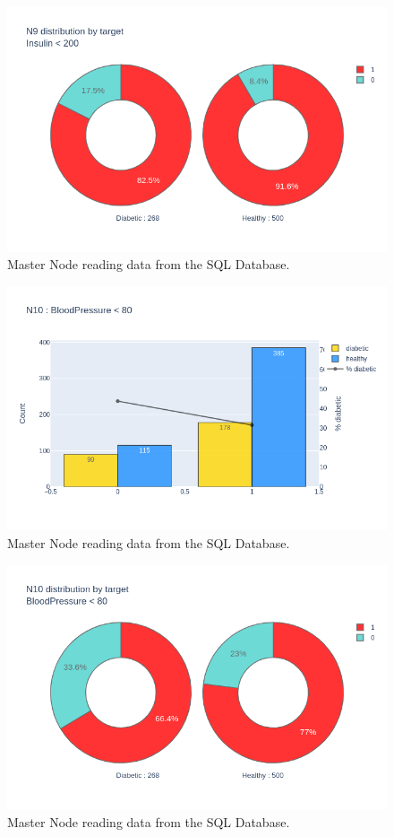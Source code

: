 \documentclass[12pt]{article}
\begin{document}
\begin{figure}[ht]
\centering
\includegraphics[width=1\textwidth]{newplot(33).png}
\caption{Master Node reading data from the SQL Database.}
\end{figure}

\begin{figure}[ht]
\centering
\includegraphics[width=1\textwidth]{newplot(34).png}
\caption{Master Node reading data from the SQL Database.}
\end{figure}

\begin{figure}[ht]
\centering
\includegraphics[width=1\textwidth]{newplot(35).png}
\caption{Master Node reading data from the SQL Database.}
\end{figure}
\end{document}

